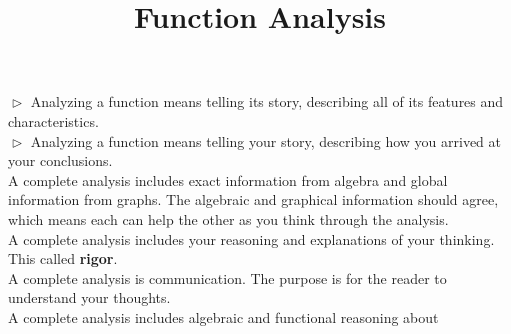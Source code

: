 \documentclass{ximera}
\title{Function Analysis}
\begin{document}
\begin{abstract}
\end{abstract}
\maketitle




\textbf{\textcolor{blue!55!black}{$\vartriangleright$}}  Analyzing a function means telling its story, describing all of its features and characteristics.  \\


\textbf{\textcolor{blue!55!black}{$\vartriangleright$}} Analyzing a function means telling your story, describing how you arrived at your conclusions. \\ 






A complete analysis includes exact information from algebra and global information from graphs.  The algebraic and graphical information should agree, which means each can help the other as you think through the analysis.\\




A complete analysis includes your reasoning and explanations of your thinking. This called \textbf{\textcolor{purple!85!blue}{rigor}}. \\


A complete analysis is communication.  The purpose is for the reader to understand your thoughts. \\





A complete analysis includes algebraic and functional reasoning about 
\end{document}
